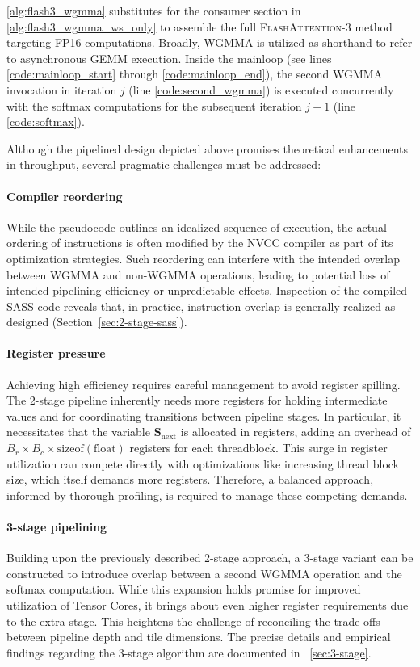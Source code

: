 \cref{alg:flash3_wgmma} substitutes for the consumer section in \cref{alg:flash3_wgmma_ws_only} to assemble the full \textsc{FlashAttention-3} method targeting FP16 computations. Broadly, WGMMA is utilized as shorthand to refer to asynchronous GEMM execution. Inside the mainloop (see lines \ref{code:mainloop_start} through \ref{code:mainloop_end}), the second WGMMA invocation in iteration $j$ (line \ref{code:second_wgmma}) is executed concurrently with the softmax computations for the subsequent iteration $j+1$ (line \ref{code:softmax}).

Although the pipelined design depicted above promises theoretical enhancements in throughput, several pragmatic challenges must be addressed:
\paragraph{Compiler reordering} While the pseudocode outlines an idealized sequence of execution, the actual ordering of instructions is often modified by the NVCC compiler as part of its optimization strategies. Such reordering can interfere with the intended overlap between WGMMA and non-WGMMA operations, leading to potential loss of intended pipelining efficiency or unpredictable effects. Inspection of the compiled SASS code reveals that, in practice, instruction overlap is generally realized as designed (Section~\ref{sec:2-stage-sass}).
\paragraph{Register pressure} Achieving high efficiency requires careful management to avoid register spilling. The 2-stage pipeline inherently needs more registers for holding intermediate values and for coordinating transitions between pipeline stages. In particular, it necessitates that the variable $\mathbf{S}_{\mathrm{next}}$ is allocated in registers, adding an overhead of $B_r \times B_c \times \text{sizeof}(\text{float})$ registers for each threadblock. This surge in register utilization can compete directly with optimizations like increasing thread block size, which itself demands more registers. Therefore, a balanced approach, informed by thorough profiling, is required to manage these competing demands.
\paragraph{3-stage pipelining} Building upon the previously described 2-stage approach, a 3-stage variant can be constructed to introduce overlap between a second WGMMA operation and the softmax computation. While this expansion holds promise for improved utilization of Tensor Cores, it brings about even higher register requirements due to the extra stage. This heightens the challenge of reconciling the trade-offs between pipeline depth and tile dimensions. The precise details and empirical findings regarding the 3-stage algorithm are documented in ~\cref{sec:3-stage}.


